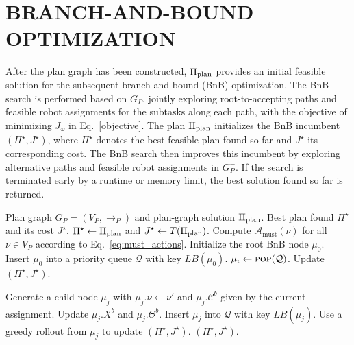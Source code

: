 \documentclass[lettersize,journal]{IEEEtran}
\theoremstyle{italiclemma}
\theoremstyle{italiclemma}
\theoremstyle{definition}
\begin{document}
\section{BRANCH-AND-BOUND OPTIMIZATION}
\label{sec:bnb_optimization}
After the plan graph has been constructed,
$\Pi_{\rm plan}$ provides an initial feasible solution for the subsequent branch-and-bound (BnB) optimization. The BnB search is performed based on $G_P$,  jointly exploring root-to-accepting paths and feasible robot assignments for the subtasks along each path, with the objective of minimizing $J_\varphi$ in Eq.~\eqref{objective}. The plan $\Pi_{\rm plan}$ initializes the BnB incumbent $(\Pi^\star,J^\star)$, where $\Pi^\star$ denotes the best feasible
plan found so far and $J^\star$ its corresponding cost. The BnB search then improves this incumbent by exploring alternative paths and feasible robot assignments in $G_P^{-}$. If the search is terminated early by a runtime or memory limit, the best solution found so far is returned.


\begin{algorithm}[t]
\caption{\textsc{BnB\_Optimization}}
\label{alg:bnb}
\begin{algorithmic}[1]
\REQUIRE Plan graph $G_P=(V_P,\rightarrow_P)$ and plan-graph solution $\Pi_{\rm plan}$.
\ENSURE Best plan found $\Pi^\star$ and its cost $J^\star$.
\STATE $\Pi^\star\gets\Pi_{\rm plan}$ and
$J^\star\gets T(\Pi_{\rm plan})$.
\STATE Compute $\mathcal A_{\mathrm{must}}(\nu)$ for all
$\nu\in V_P$ according to Eq.~\eqref{eq:must_actions}.
\STATE Initialize the root BnB node $\mu_0$.
\STATE Insert $\mu_0$ into a priority queue $\mathcal{Q}$ with key $LB(\mu_0)$.
    \STATE $\mu_i\gets\textsc{pop}(\mathcal Q)$.    
        \STATE {}
    \ENDIF
            \STATE Update $(\Pi^\star,J^\star)$.
        \ENDIF
        \STATE {}
    \ENDIF

            \STATE Generate a child node $\mu_j$ with
            $\mu_j.\nu\gets\nu'$ and $\mu_j.\mathcal C^b$ given by the current assignment.
            \STATE  Update $\mu_j.X^b$ and $\mu_j.\Theta^b$.
                \STATE {}
            \ENDIF
                \STATE Insert $\mu_j$ into $\mathcal Q$ with key
                $LB(\mu_j)$.
            \ENDIF
            \STATE Use a greedy rollout from $\mu_j$ to update  $(\Pi^\star,J^\star)$.
        \ENDFOR
    \ENDFOR
\ENDWHILE
\RETURN $(\Pi^\star,J^\star)$.
\end{algorithmic}
\end{algorithm}
\end{document}
